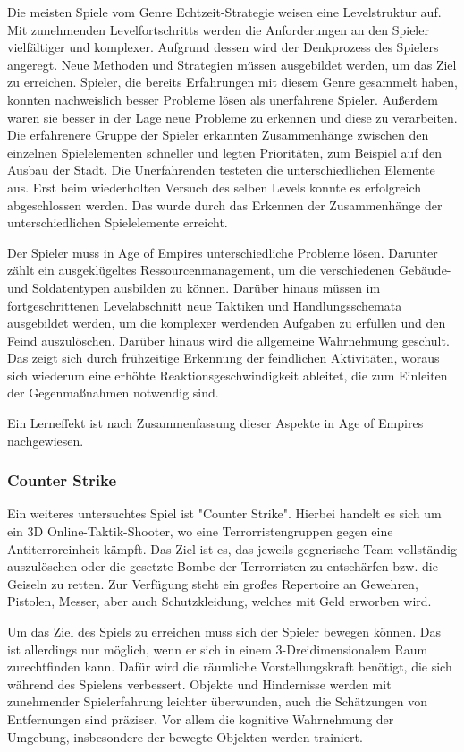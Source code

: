 Die meisten Spiele vom Genre Echtzeit-Strategie weisen eine Levelstruktur auf. Mit zunehmenden Levelfortschritts werden die Anforderungen an den Spieler vielfältiger und komplexer. Aufgrund dessen wird der Denkprozess des Spielers angeregt. Neue Methoden und Strategien müssen ausgebildet werden, um das Ziel zu erreichen. Spieler, die bereits Erfahrungen mit diesem Genre gesammelt haben, konnten nachweislich besser Probleme lösen als unerfahrene Spieler. Außerdem waren sie besser in der Lage neue Probleme zu erkennen und diese zu verarbeiten. Die erfahrenere Gruppe der Spieler erkannten Zusammenhänge zwischen den einzelnen Spielelementen schneller und legten Prioritäten, zum Beispiel auf den Ausbau der Stadt. Die Unerfahrenden testeten die unterschiedlichen Elemente aus. Erst beim wiederholten Versuch des selben Levels konnte es erfolgreich abgeschlossen werden. Das wurde durch das Erkennen der Zusammenhänge der unterschiedlichen Spielelemente erreicht.

Der Spieler muss in Age of Empires unterschiedliche Probleme lösen. Darunter zählt ein ausgeklügeltes Ressourcenmanagement, um die verschiedenen Gebäude- und Soldatentypen ausbilden zu können. Darüber hinaus müssen im fortgeschrittenen Levelabschnitt neue Taktiken und Handlungsschemata ausgebildet werden, um die komplexer werdenden Aufgaben zu erfüllen und den Feind auszulöschen. Darüber hinaus wird die allgemeine Wahrnehmung geschult. Das zeigt sich durch frühzeitige Erkennung der feindlichen Aktivitäten, woraus sich wiederum eine erhöhte Reaktionsgeschwindigkeit ableitet, die zum Einleiten der Gegenmaßnahmen notwendig sind. 

Ein Lerneffekt ist nach Zusammenfassung dieser Aspekte in Age of Empires nachgewiesen.

\subsubsection{Counter Strike}
Ein weiteres untersuchtes Spiel ist "{}Counter Strike"{}. Hierbei handelt es sich um ein 3D Online-Taktik-Shooter, wo eine Terrorristengruppen gegen eine Antiterroreinheit kämpft. Das Ziel ist es, das jeweils gegnerische Team vollständig auszulöschen oder die gesetzte Bombe der Terrorristen zu entschärfen bzw. die Geiseln zu retten. Zur Verfügung steht ein großes Repertoire an Gewehren, Pistolen, Messer, aber auch Schutzkleidung, welches mit Geld erworben wird.

Um das Ziel des Spiels zu erreichen muss sich der Spieler bewegen können. Das ist allerdings nur möglich, wenn er sich in einem 3-Dreidimensionalem Raum zurechtfinden kann. Dafür wird die räumliche Vorstellungskraft benötigt, die sich während des Spielens verbessert.\cite{christianstoecker2004} Objekte und Hindernisse werden mit zunehmender Spielerfahrung leichter überwunden, auch die Schätzungen von Entfernungen sind präziser. Vor allem die kognitive Wahrnehmung der Umgebung, insbesondere der bewegte Objekten werden trainiert.\cite{frankstoewer2003} 

